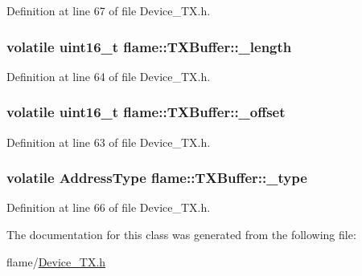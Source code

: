 Definition at line 67 of file Device\-\_\-\-T\-X.\-h.

\hypertarget{classflame_1_1_t_x_buffer_a7237489370200b26a4a9ae7b829faa7a}{
\subsubsection[{\-\_\-length}]{\setlength{\rightskip}{0pt plus 5cm}volatile uint16\-\_\-t flame\-::\-T\-X\-Buffer\-::\-\_\-length\hspace{0.3cm}{\ttfamily [protected]}}}\label{classflame_1_1_t_x_buffer_a7237489370200b26a4a9ae7b829faa7a}


Definition at line 64 of file Device\-\_\-\-T\-X.\-h.

\hypertarget{classflame_1_1_t_x_buffer_ac2b091fd502d089763813100635c06de}{
\subsubsection[{\-\_\-offset}]{\setlength{\rightskip}{0pt plus 5cm}volatile uint16\-\_\-t flame\-::\-T\-X\-Buffer\-::\-\_\-offset\hspace{0.3cm}{\ttfamily [protected]}}}\label{classflame_1_1_t_x_buffer_ac2b091fd502d089763813100635c06de}


Definition at line 63 of file Device\-\_\-\-T\-X.\-h.

\hypertarget{classflame_1_1_t_x_buffer_af5929a77f1d17118f0358da1d6cce8f3}{
\subsubsection[{\-\_\-type}]{\setlength{\rightskip}{0pt plus 5cm}volatile {\bf Address\-Type} flame\-::\-T\-X\-Buffer\-::\-\_\-type\hspace{0.3cm}{\ttfamily [protected]}}}\label{classflame_1_1_t_x_buffer_af5929a77f1d17118f0358da1d6cce8f3}


Definition at line 66 of file Device\-\_\-\-T\-X.\-h.



The documentation for this class was generated from the following file\-:\begin{DoxyCompactItemize}
\item 
flame/\hyperlink{_device___t_x_8h}{Device\-\_\-\-T\-X.\-h}\end{DoxyCompactItemize}

